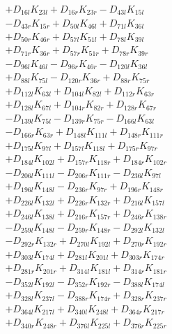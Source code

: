 \begin{multicols}{2}
\begin{align}
&+ D_{16l}K_{23l} + D_{16r}K_{23r} - D_{43l}K_{15l}  \nonumber \\
&- D_{43r}K_{15r} + D_{50l}K_{46l} + D_{71l}K_{36l}  \nonumber \\
&+ D_{50r}K_{46r} + D_{57l}K_{51l} + D_{78l}K_{39l}  \nonumber \\
&+ D_{71r}K_{36r} + D_{57r}K_{51r} + D_{78r}K_{39r}  \nonumber \\
&- D_{96l}K_{46l} - D_{96r}K_{46r} - D_{120l}K_{36l}  \nonumber \\
&+ D_{88l}K_{75l} - D_{120r}K_{36r} + D_{88r}K_{75r}  \nonumber \\
&+ D_{112l}K_{63l} + D_{104l}K_{82l} + D_{112r}K_{63r}  \nonumber \\
&+ D_{128l}K_{67l} + D_{104r}K_{82r} + D_{128r}K_{67r}  \nonumber \\
&- D_{139l}K_{75l} - D_{139r}K_{75r} - D_{166l}K_{63l}  \nonumber \\
&- D_{166r}K_{63r} + D_{148l}K_{111l} + D_{148r}K_{111r}  \nonumber \\
&+ D_{175l}K_{97l} + D_{157l}K_{118l} + D_{175r}K_{97r}  \nonumber \\
&+ D_{184l}K_{102l} + D_{157r}K_{118r} + D_{184r}K_{102r}  \nonumber \\
&- D_{206l}K_{111l} - D_{206r}K_{111r} - D_{236l}K_{97l}  \nonumber \\
&+ D_{196l}K_{148l} - D_{236r}K_{97r} + D_{196r}K_{148r}  \nonumber \\
&+ D_{226l}K_{132l} + D_{226r}K_{132r} + D_{216l}K_{157l}  \nonumber \\
&+ D_{246l}K_{138l} + D_{216r}K_{157r} + D_{246r}K_{138r}  \nonumber \\
&- D_{259l}K_{148l} - D_{259r}K_{148r} - D_{292l}K_{132l}  \nonumber \\
&- D_{292r}K_{132r} + D_{270l}K_{192l} + D_{270r}K_{192r}  \nonumber \\
&+ D_{303l}K_{174l} + D_{281l}K_{201l} + D_{303r}K_{174r}  \nonumber \\
&+ D_{281r}K_{201r} + D_{314l}K_{181l} + D_{314r}K_{181r}  \nonumber \\
&- D_{352l}K_{192l} - D_{352r}K_{192r} - D_{388l}K_{174l}  \nonumber \\
&+ D_{328l}K_{237l} - D_{388r}K_{174r} + D_{328r}K_{237r}  \nonumber \\
&+ D_{364l}K_{217l} + D_{340l}K_{248l} + D_{364r}K_{217r}  \nonumber \\
&+ D_{340r}K_{248r} + D_{376l}K_{225l} + D_{376r}K_{225r}  \nonumber \\

\end{align}
\end{multicols}
